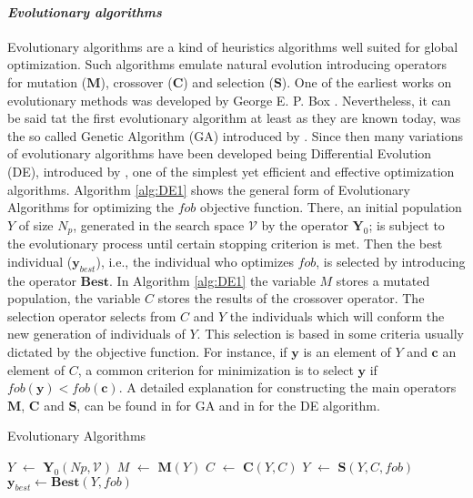 \paragraph{\it Evolutionary algorithms}
Evolutionary algorithms are a kind of heuristics algorithms well 
suited for global optimization. Such algorithms emulate natural
evolution introducing operators for mutation ($\mathbf{M}$), crossover 
($\mathbf{C}$) and selection ($\mathbf{S}$). One of the earliest works
on evolutionary methods was developed by George E. P. Box \cite{Box1957}.
Nevertheless, it can be said tat the first evolutionary algorithm at
least as they are known today, was the so called Genetic Algorithm (GA) 
introduced by \citet{JHH1975}. Since then many variations of
evolutionary algorithms have been developed being Differential Evolution (DE),
introduced by \citet{Storn1997}, one of the simplest yet 
efficient and 
effective optimization algorithms. Algorithm \ref{alg:DE1} shows the 
general form of Evolutionary Algorithms for optimizing the $fob$ 
objective function. There, an initial population $Y$ of size $N_p$, 
generated in the search space $\mathcal{V}$ by the operator $\mathbf{Y}_0$;
is subject to the evolutionary process until certain stopping criterion is 
met. Then the best individual ($\mathbf{y}_{best}$), i.e., the individual who
optimizes $fob$, is selected by introducing the operator $\mathbf{Best}$. 
In Algorithm \ref{alg:DE1} the variable $M$ stores a mutated population, 
the variable $C$ stores the results of the crossover operator. The selection
operator selects from $C$ and $Y$ the individuals which will conform the new
generation of individuals of $Y$. This selection is based in some criteria 
usually dictated by the
objective function. For instance, if $\mathbf{y}$ is an element of $Y$
and $\mathbf{c}$ an element of $C$, a common criterion for minimization is 
to select $\mathbf{y}$ if $fob(\mathbf{y})<fob(\mathbf{c})$.
A detailed explanation for constructing the main operators 
$\mathbf{M}$, $\mathbf{C}$ and $\mathbf{S}$, can be found in
\cite{Bagchi1999} for GA and in \cite{Price_Storn2005} for the DE
algorithm.
%
\begin{algorithm}[htb]
  \caption{Evolutionary Algorithms}
  \label{alg:DE1}
  \begin{algorithmic}
    \State $Y$ $\leftarrow$ $\mathbf{Y}_0(Np,\mathcal{V})$
    \State $M$ $\leftarrow$  $\mathbf{M}(Y)$
    \State $C$ $\leftarrow$  $\mathbf{C}(Y,C)$
    \State $Y$ $\leftarrow$  $\mathbf{S}(Y,C,fob)$ 
    \EndWhile
    \State $\mathbf{y}_{best} \leftarrow \mathbf{Best}(Y, fob)$
  \end{algorithmic}
\end{algorithm}%


